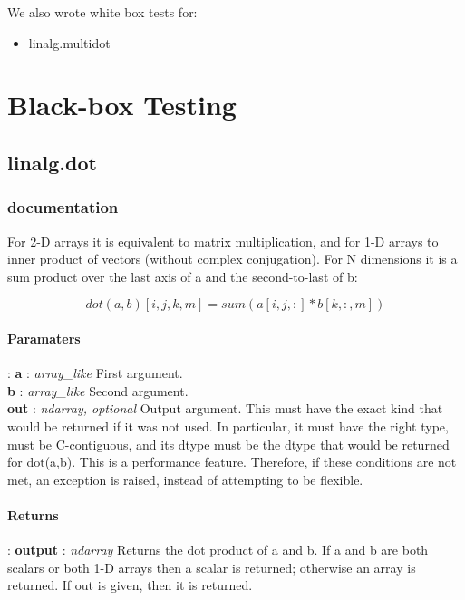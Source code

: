 \documentclass[a4paper,11pt]{article}
\begin{document}
We also wrote white box tests for:
\begin{itemize}
	\item linalg.multidot 
\end{itemize}





\section{Black-box Testing}
\subsection{linalg.dot}
\subsubsection{documentation}
For 2-D arrays it is equivalent to matrix multiplication, and for 1-D arrays to inner product of vectors (without complex conjugation). For N dimensions it is a sum product over the last axis of a and the second-to-last of b:

    \begin{equation} dot(a, b)[i,j,k,m] = sum(a[i,j,:] * b[k,:,m]) \end{equation}
    
   \paragraph{Paramaters}: \textbf{a} : \textit{array\_like} First argument.\\
	\indent \hspace{2.2cm} \textbf{b} : \textit{array\_like} Second argument.\\
\indent \hspace{2.2cm} \textbf{out} : \textit{ndarray, optional} Output argument. This must have the exact kind that would be returned if it was not used. In particular, it must have the right type, must be C-contiguous, and its dtype must be the dtype that would be returned for dot(a,b). This is a performance feature. Therefore, if these conditions are not met, an exception is raised, instead of attempting to be flexible.
    \paragraph{Returns}:    \textbf{output} : \textit{ndarray}
Returns the dot product of a and b. If a and b are both scalars or both 1-D arrays then a scalar is returned; otherwise an array is returned. If out is given, then it is returned.\\
\end{document}
